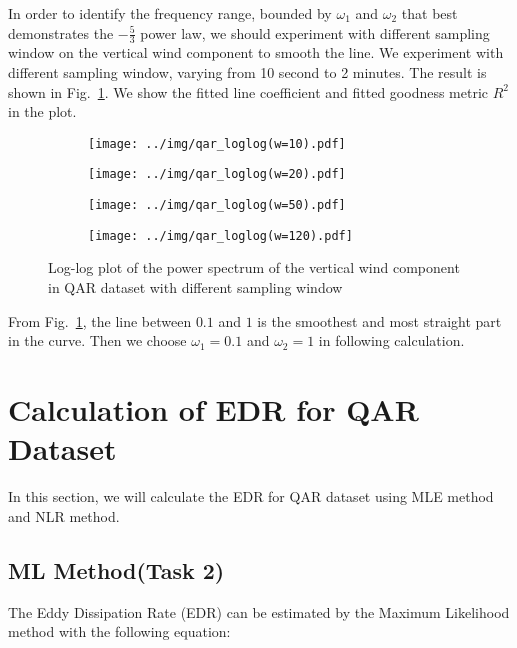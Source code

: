 \documentclass[runningheads]{llncs}
\begin{document}
In order to identify the frequency range, bounded by $\omega_1$ and $\omega_2$ that best demonstrates the $-\frac53$ power law,
we should experiment with different sampling window on the vertical wind component to smooth the line. 
We experiment with different sampling window, varying from 10 second to 2 minutes. The result is shown in Fig.~\ref{fig:1}.
We show the fitted line coefficient and fitted goodness metric $R^2$ in the plot.

\begin{figure}
    \centering
    \begin{subfigure}{.4\textwidth}
        \centering
        \texttt{[image: ../img/qar\_loglog(w=10).pdf]}  
    \end{subfigure}
    \begin{subfigure}{.4\textwidth}
        \centering
        \texttt{[image: ../img/qar\_loglog(w=20).pdf]}  
    \end{subfigure}
    \begin{subfigure}{.4\textwidth}
        \centering
        \texttt{[image: ../img/qar\_loglog(w=50).pdf]}  
    \end{subfigure}
    \begin{subfigure}{.4\textwidth}
        \centering
        \texttt{[image: ../img/qar\_loglog(w=120).pdf]}  
    \end{subfigure}
    \caption{Log-log plot of the power spectrum of the vertical wind component in QAR dataset with different sampling window}
    \label{fig:1}
\end{figure}

From Fig.~\ref{fig:1}, the line between $0.1$ and $1$ is the smoothest and most straight part in the curve.
Then we choose $\omega_1=0.1$ and $\omega_2=1$ in following calculation.

\section{Calculation of EDR for QAR Dataset}

In this section, we will calculate the EDR for QAR dataset using MLE method and NLR method.

\subsection{ML Method(Task 2)}

The Eddy Dissipation Rate (EDR) can be estimated by the Maximum Likelihood method with the following equation:
\end{document}
